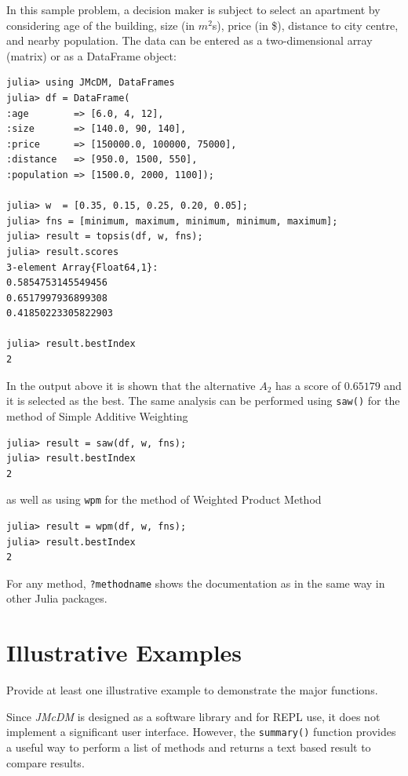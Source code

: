 \documentclass[authoryear,preprint,review,12pt]{elsarticle}
\begin{document}
In this sample problem, a decision maker is subject to select an apartment by considering age of the building, size (in $m^2$s), price (in \$), distance to city centre, and nearby population.
The data can be entered as a two-dimensional array (matrix) or as a DataFrame object:

\begin{verbatim}
julia> using JMcDM, DataFrames
julia> df = DataFrame(
:age        => [6.0, 4, 12],
:size       => [140.0, 90, 140],
:price      => [150000.0, 100000, 75000],
:distance   => [950.0, 1500, 550],
:population => [1500.0, 2000, 1100]);

julia> w  = [0.35, 0.15, 0.25, 0.20, 0.05];
julia> fns = [minimum, maximum, minimum, minimum, maximum];
julia> result = topsis(df, w, fns);
julia> result.scores
3-element Array{Float64,1}:
0.5854753145549456
0.6517997936899308
0.41850223305822903

julia> result.bestIndex
2
\end{verbatim}

In the output above it is shown that the alternative $A_2$ has a score of $0.65179$ and it is selected as the best. The same analysis can be performed using \texttt{saw()} for the method of Simple Additive Weighting

\begin{verbatim}
julia> result = saw(df, w, fns);
julia> result.bestIndex
2
\end{verbatim}

\noindent as well as using \texttt{wpm} for the method of Weighted Product Method

\begin{verbatim}
julia> result = wpm(df, w, fns);
julia> result.bestIndex
2
\end{verbatim}

For any method, \texttt{?methodname} shows the documentation as in the same way in other Julia packages.

\section{Illustrative Examples}
\label{sec:Illustrative_examples}
{\color{red}Provide at least one illustrative example to demonstrate the major functions.}

Since \emph{JMcDM} is designed as a software library and for REPL use, it does not implement
a significant user interface. However, the \texttt{summary()} function provides a useful way
to perform a list of methods and returns a text based result to compare results. 
\end{document}
